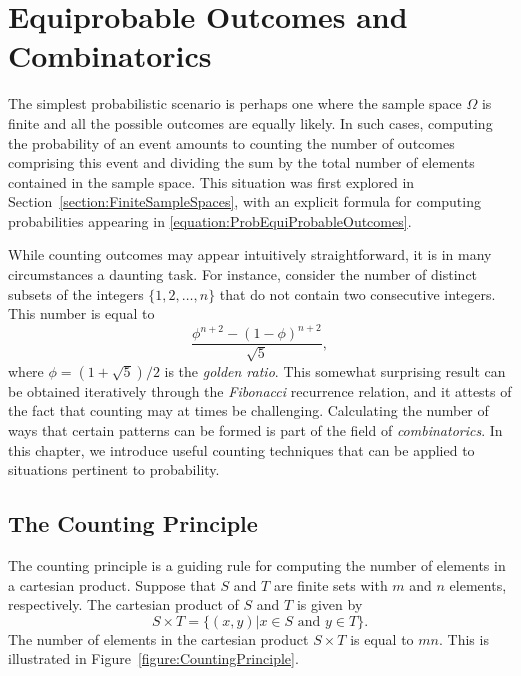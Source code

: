 \chapter{Equiprobable Outcomes and Combinatorics}

The simplest probabilistic scenario is perhaps one where the sample space $\Omega$ is finite and all the possible outcomes are equally likely.
In such cases, computing the probability of an event amounts to counting the number of outcomes comprising this event and dividing the sum by the total number of elements contained in the sample space.
This situation was first explored in Section~\ref{section:FiniteSampleSpaces}, with an explicit formula for computing probabilities appearing in \eqref{equation:ProbEquiProbableOutcomes}.

While counting outcomes may appear intuitively straightforward, it is in many circumstances a daunting task.
For instance, consider the number of distinct subsets of the integers $\{ 1, 2, \ldots, n \}$ that do not contain two consecutive integers.
This number is equal to
\begin{equation*}
\frac{ \phi^{n+2} - (1 - \phi)^{n+2} }{ \sqrt{5} } ,
\end{equation*}
where $\phi = (1 + \sqrt{5}) / 2$ is the \emph{golden ratio}.
This somewhat surprising result can be obtained iteratively through the \emph{Fibonacci} recurrence relation, and it attests of the fact that counting may at times be challenging.
Calculating the number of ways that certain patterns can be formed is part of the field of \emph{combinatorics}. 
In this chapter, we introduce useful counting techniques that can be applied to situations pertinent to probability.


\section{The Counting Principle}

The counting principle is a guiding rule for computing the number of elements in a cartesian product.
Suppose that $S$ and $T$ are finite sets with $m$ and $n$ elements, respectively.
The cartesian product of $S$ and $T$ is given by
\begin{equation*}
S \times T = \{ (x, y) | x \in S \text{ and } y \in T \} .
\end{equation*}
The number of elements in the cartesian product $S \times T$ is equal to $m n$.
This is illustrated in Figure~\ref{figure:CountingPrinciple}.

